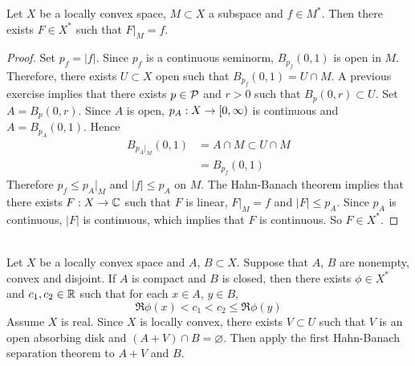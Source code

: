 \documentclass{book}
\begin{document}
	\begin{ex}
		Let $X$ be a locally convex space, $M \subset X$ a subspace and $f \in M^*$. Then there exists $F \in X^*$ such that $F|_M = f$.  
	\end{ex}

	\begin{proof}
		Set $p_f = |f|$. Since $p_f$ is a continuous seminorm, $B_{p_f}(0,1)$ is open in $M$. Therefore, there exists $U \subset X$ open such that $B_{p_f}(0,1) = U \cap M$. A previous exercise implies that there exists $p \in \mathcal{P}$ and $r >0$ such that $B_p(0, r) \subset U$. Set $A = B_p(0, r)$. Since $A$ is open, $p_A:X \rightarrow [0,\infty)$ is continuous and $A = B_{p_A}(0,1)$. Hence 
		\begin{align*}
			B_{p_A|_M}(0,1) 
			&= A \cap M \subset U \cap M \\
			&= B_{p_f}(0,1) 
		\end{align*}  
		Therefore $p_f \leq p_A|_M$ and $|f| \leq p_A$ on $M$. The Hahn-Banach theorem implies that there exists $F:X \rightarrow \mathbb{C}$ such that $F$ is linear, $F|_M = f$ and $|F| \leq p_A$. Since $p_A$ is continuous, $|F|$ is continuous, which implies that $F$ is continuous. So $F \in X^*$.  
	\end{proof}
	
	\begin{ex} \\
		Let $X$ be a locally convex space and $A$, $B \subset X$. Suppose that $A$, $B$ are nonempty, convex and disjoint. If $A$ is compact and $B$ is closed, then there exists $\phi \in X^*$ and $c_1, c_2 \in \mathbb{R}$ such that for each $x \in A$, $y \in B$, $$\Re \phi(x) < c_1 < c_2 \leq \Re \phi(y)$$
		 Assume $X$ is real. Since $X$ is locally convex, there exists $V \subset U$ such that $V$ is an open absorbing disk and $(A + V) \cap B = \varnothing$. Then apply the first Hahn-Banach separation theorem to $A+V$ and $B$.
	\end{ex}
	
\end{document}
